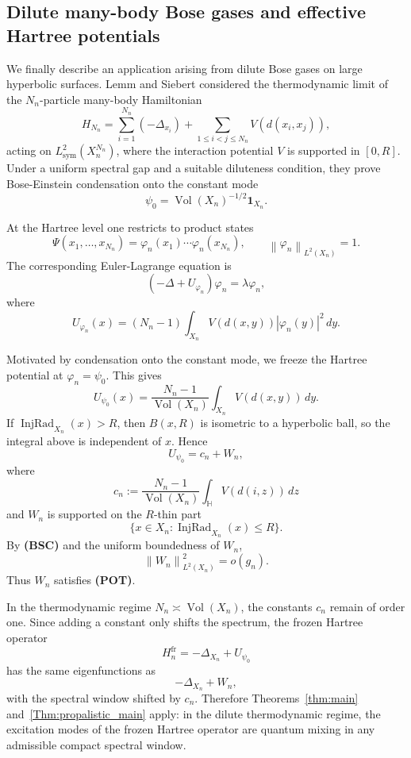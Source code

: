 \documentclass[11pt,twoside,reqno]{amsart}
\renewcommand{\phi}{\varphi}
\newcommand{\1}{\mathrm{\mathbf{1}}}
\DeclareMathOperator{\Vol}{Vol}
\DeclareMathOperator{\InjRad}{InjRad}
\newcommand{\norm}[1]{\left\lVert#1\right\rVert}
\numberwithin{equation}{section}
\theoremstyle{plain}
\theoremstyle{definition}
\theoremstyle{remark}
\begin{document}
\subsection{Dilute many-body Bose gases and effective Hartree potentials}

We finally describe an application arising from dilute Bose gases on large
hyperbolic surfaces. Lemm and Siebert \cite{LemmSiebertBEC2022} considered
the thermodynamic limit of the $N_n$-particle many-body Hamiltonian
\[
    H_{N_n}
    =
    \sum_{i=1}^{N_n}(-\Delta_{x_i})
    +
    \sum_{1\leq i<j\leq N_n}V(d(x_i,x_j)),
\]
acting on
$L^2_{\mathrm{sym}}(X_n^{N_n})$, where the interaction potential $V$ is
supported in $[0,R]$. Under a uniform spectral gap and a suitable diluteness
condition, they prove Bose-Einstein condensation onto the constant mode
\[
    \psi_0
    =
    \Vol(X_n)^{-1/2}\mathbf 1_{X_n}.
\]

At the Hartree level one restricts to product states
\[
    \Psi(x_1,\ldots,x_{N_n})
    =
    \phi_n(x_1)\cdots\phi_n(x_{N_n}),
    \qquad
    \norm{\phi_n}_{L^2(X_n)}=1.
\]
The corresponding Euler-Lagrange equation is
\[
    (-\Delta+U_{\phi_n})\phi_n
    =
    \lambda\phi_n,
\]
where
\[
    U_{\phi_n}(x)
    =
    (N_n-1)
    \int_{X_n}
    V(d(x,y))|\phi_n(y)|^2\,dy.
\]

Motivated by condensation onto the constant mode, we freeze the Hartree
potential at $\phi_n=\psi_0$. This gives
\[
    U_{\psi_0}(x)
    =
    \frac{N_n-1}{\Vol(X_n)}
    \int_{X_n}V(d(x,y))\,dy.
\]
If $\InjRad_{X_n}(x)>R$, then $B(x,R)$ is isometric to a hyperbolic ball, so
the integral above is independent of $x$. Hence
\[
    U_{\psi_0}
    =
    c_n+W_n,
\]
where
\[
    c_n
    :=
    \frac{N_n-1}{\Vol(X_n)}
    \int_{\mathbb H}V(d(i,z))\,dz
\]
and $W_n$ is supported on the $R$-thin part
\[
    \{x\in X_n:\InjRad_{X_n}(x)\leq R\}.
\]
By \textbf{(BSC)} and the uniform boundedness of $W_n$,
\[
    \norm{W_n}_{L^2(X_n)}^2=o(g_n).
\]
Thus $W_n$ satisfies \textbf{(POT)}.

In the thermodynamic regime $N_n\asymp\Vol(X_n)$, the constants $c_n$ remain
of order one. Since adding a constant only shifts the spectrum, the frozen
Hartree operator
\[
    H_n^{\mathrm{fr}}
    =
    -\Delta_{X_n}+U_{\psi_0}
\]
has the same eigenfunctions as
\[
    -\Delta_{X_n}+W_n,
\]
with the spectral window shifted by $c_n$. Therefore
Theorems~\ref{thm:main} and~\ref{Thm:propalistic_main} apply: in the dilute
thermodynamic regime, the excitation modes of the frozen Hartree operator are
quantum mixing in any admissible compact spectral window.
\end{document}
